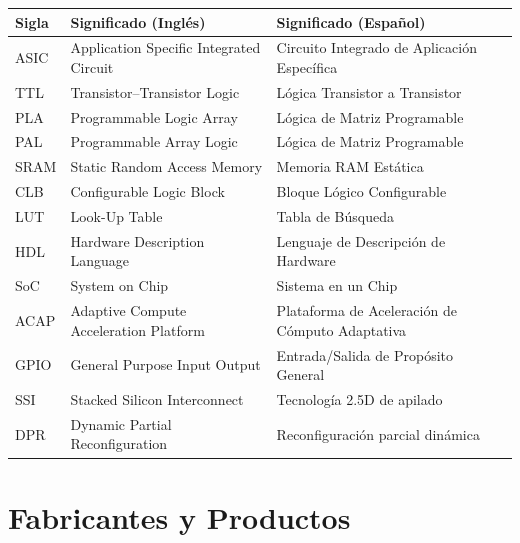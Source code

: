 \documentclass[a4paper,12pt]{article}
\renewcommand{\arraystretch}{1.4}
\begin{document}
\begin{table}[H]
	\centering
	\renewcommand{\arraystretch}{1.3}
	\begin{tabularx}{\textwidth}{lXX}
		\toprule
		\textbf{Sigla} & \textbf{Significado (Inglés)} & \textbf{Significado (Español)} \\
		\midrule
		ASIC & Application Specific Integrated Circuit & Circuito Integrado de Aplicación Específica \\
			\midrule
		TTL & Transistor--Transistor Logic & Lógica Transistor a Transistor \\
			\midrule
		PLA & Programmable Logic Array & Lógica de Matriz Programable \\
		\midrule
		PAL & Programmable Array Logic & Lógica de Matriz Programable \\
			\midrule
		SRAM & Static Random Access Memory & Memoria RAM Estática \\
			\midrule
		CLB & Configurable Logic Block & Bloque Lógico Configurable \\
			\midrule
		LUT & Look-Up Table & Tabla de Búsqueda \\
			\midrule
		HDL & Hardware Description Language & Lenguaje de Descripción de Hardware \\
			\midrule
		SoC & System on Chip & Sistema en un Chip \\
			\midrule
		ACAP & Adaptive Compute Acceleration Platform & Plataforma de Aceleración de Cómputo Adaptativa \\
			\midrule
		GPIO & General Purpose Input Output & Entrada/Salida de Propósito General \\
		    \midrule
		SSI & Stacked Silicon Interconnect & Tecnología 2.5D de apilado\\
		    \midrule
		DPR & Dynamic Partial Reconfiguration & Reconfiguración parcial dinámica\\
		\bottomrule
	\end{tabularx}
\end{table}
\newpage

\section*{Fabricantes y Productos}
\end{document}
